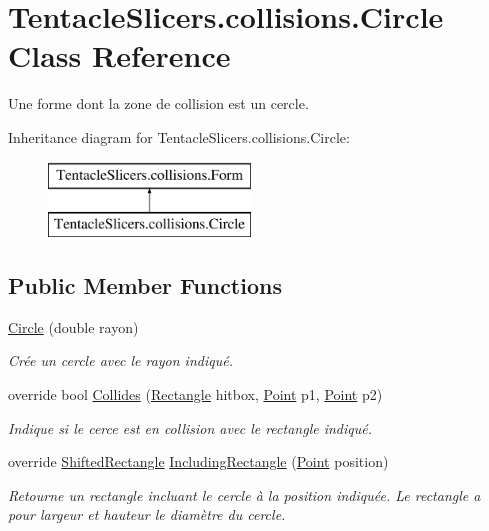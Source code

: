 \hypertarget{class_tentacle_slicers_1_1collisions_1_1_circle}{}\section{Tentacle\+Slicers.\+collisions.\+Circle Class Reference}
\label{class_tentacle_slicers_1_1collisions_1_1_circle}


Une forme dont la zone de collision est un cercle.  


Inheritance diagram for Tentacle\+Slicers.\+collisions.\+Circle\+:\begin{figure}[H]
\begin{center}
\leavevmode
\includegraphics[height=2.000000cm]{class_tentacle_slicers_1_1collisions_1_1_circle}
\end{center}
\end{figure}
\subsection*{Public Member Functions}
\begin{DoxyCompactItemize}
\item 
\hyperlink{class_tentacle_slicers_1_1collisions_1_1_circle_a37560db1d37806aed9854613f3d815b2}{Circle} (double rayon)
\begin{DoxyCompactList}\small\item\em Crée un cercle avec le rayon indiqué. \end{DoxyCompactList}\item 
override bool \hyperlink{class_tentacle_slicers_1_1collisions_1_1_circle_ab10bf9ec3edacdee45d26ea035dae849}{Collides} (\hyperlink{class_tentacle_slicers_1_1collisions_1_1_rectangle}{Rectangle} hitbox, \hyperlink{class_tentacle_slicers_1_1general_1_1_point}{Point} p1, \hyperlink{class_tentacle_slicers_1_1general_1_1_point}{Point} p2)
\begin{DoxyCompactList}\small\item\em Indique si le cerce est en collision avec le rectangle indiqué. \end{DoxyCompactList}\item 
override \hyperlink{struct_tentacle_slicers_1_1collisions_1_1_shifted_rectangle}{Shifted\+Rectangle} \hyperlink{class_tentacle_slicers_1_1collisions_1_1_circle_a6bf295c6a8768b43e53f37a349678d37}{Including\+Rectangle} (\hyperlink{class_tentacle_slicers_1_1general_1_1_point}{Point} position)
\begin{DoxyCompactList}\small\item\em Retourne un rectangle incluant le cercle à la position indiquée. Le rectangle a pour largeur et hauteur le diamètre du cercle. \end{DoxyCompactList}\end{DoxyCompactItemize}


